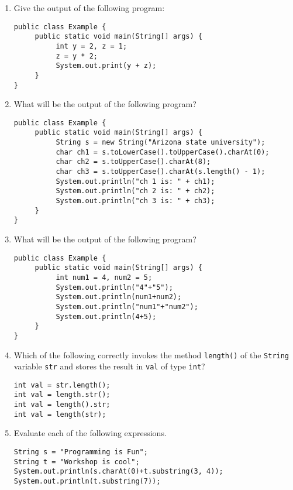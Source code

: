 \setcounter{counter}{1}
\begin{enumerate}[label={\arabic{counter}\addtocounter{counter}{1}}.]

\item Give the output of the following program:
\begin{lstlisting}
public class Example {
     public static void main(String[] args) {
          int y = 2, z = 1;
          z = y * 2;
          System.out.print(y + z);
     }
}
\end{lstlisting}

\item What will be the output of the following program?
\begin{lstlisting}
public class Example {
     public static void main(String[] args) {
          String s = new String("Arizona state university");
          char ch1 = s.toLowerCase().toUpperCase().charAt(0);
          char ch2 = s.toUpperCase().charAt(8);
          char ch3 = s.toUpperCase().charAt(s.length() - 1);
          System.out.println("ch 1 is: " + ch1);
          System.out.println("ch 2 is: " + ch2);
          System.out.println("ch 3 is: " + ch3);
     }
}
\end{lstlisting}


\item What will be the output of the following program?
\begin{lstlisting}
public class Example {
     public static void main(String[] args) {
          int num1 = 4, num2 = 5;
          System.out.println("4"+"5");
          System.out.println(num1+num2);
          System.out.println("num1"+"num2");
          System.out.println(4+5);
     }
}
\end{lstlisting}


\item Which of the following correctly invokes the method \verb|length()| of the \verb|String| variable \verb|str| and stores the result in \verb|val| of type \verb|int|?
\begin{lstlisting}
int val = str.length();
int val = length.str();
int val = length().str;
int val = length(str);
\end{lstlisting}

\item Evaluate each of the following expressions.
\begin{lstlisting}
String s = "Programming is Fun";
String t = "Workshop is cool";
System.out.println(s.charAt(0)+t.substring(3, 4));
System.out.println(t.substring(7));
\end{lstlisting}


\end{enumerate}
